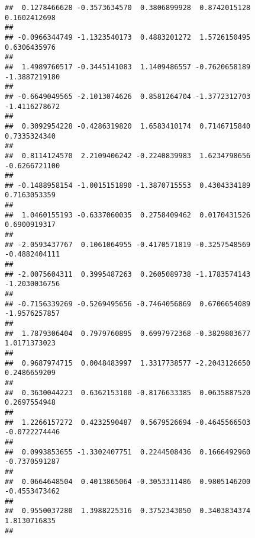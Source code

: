 \documentclass[]{article}
\begin{document}
\begin{verbatim}
##  0.1278466628 -0.3573634570  0.3806899928  0.8742015128  0.1602412698 
##                                                                       
## -0.0966344749 -1.1323540173  0.4883201272  1.5726150495  0.6306435976 
##                                                                       
##  1.4989760517 -0.3445141083  1.1409486557 -0.7620658189 -1.3887219180 
##                                                                       
## -0.6649049565 -2.1013074626  0.8581264704 -1.3772312703 -1.4116278672 
##                                                                       
##  0.3092954228 -0.4286319820  1.6583410174  0.7146715840  0.7335324340 
##                                                                       
##  0.8114124570  2.2109406242 -0.2240839983  1.6234798656 -0.6266721100 
##                                                                       
## -0.1488958154 -1.0015151890 -1.3870715553  0.4304334189  0.7163053359 
##                                                                       
##  1.0460155193 -0.6337060035  0.2758409462  0.0170431526  0.6900919317 
##                                                                       
## -2.0593437767  0.1061064955 -0.4170571819 -0.3257548569 -0.4882404111 
##                                                                       
## -2.0075604311  0.3995487263  0.2605089738 -1.1783574143 -1.2030036756 
##                                                                       
## -0.7156339269 -0.5269495656 -0.7464056869  0.6706654089 -1.9576257857 
##                                                                       
##  1.7879306404  0.7979760895  0.6997972368 -0.3829803677  1.0171373023 
##                                                                       
##  0.9687974715  0.0048483997  1.3317738577 -2.2043126650  0.2486659209 
##                                                                       
##  0.3630044223  0.6362153100 -0.8176633385  0.0635887520  0.2697554948 
##                                                                       
##  1.2266157272  0.4232590487  0.5679526694 -0.4645566503 -0.0722274446 
##                                                                       
##  0.0993853655 -1.3302407751  0.2244508436  0.1666492960 -0.7370591287 
##                                                                       
##  0.0664648504  0.4013865064 -0.3053311486  0.9805146200 -0.4553473462 
##                                                                       
##  0.9550037280  1.3988225316  0.3752343050  0.3403834374  1.8130716835 
##                                                                       

\end{verbatim}
\end{document}
